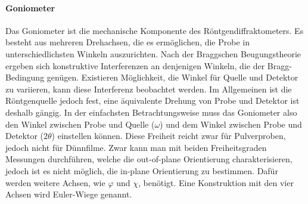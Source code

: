 \paragraph{Goniometer}
Das Goniometer ist die mechanische Komponente des Röntgendiffraktometers.
Es besteht aus mehreren Drehachsen, die es ermöglichen, die Probe in unterschiedlichsten Winkeln auszurichten.
Nach der Braggschen Beugungstheorie ergeben sich konstruktive Interferenzen an denjenigen Winkeln, die der
Bragg-Bedingung genügen.
Existieren Möglichkeit, die Winkel für Quelle und Detektor zu variieren, kann diese Interferenz beobachtet werden.
Im Allgemeinen ist die Röntgenquelle jedoch fest, eine äquivalente Drehung von Probe und Detektor ist deshalb gängig.
In der einfachsten Betrachtungsweise muss das Goniometer also den Winkel zwischen Probe und Quelle ($\omega$) und dem
Winkel zwischen Probe und Detektor ($2\theta$) einstellen können.
Diese Freiheit reicht zwar für Pulverproben, jedoch nicht für Dünnfilme.
Zwar kann man mit beiden Freiheitsgraden Messungen durchführen, welche die out-of-plane Orientierung charakterisieren,
jedoch ist es nicht möglich, die in-plane Orientierung zu bestimmen.
Dafür werden weitere Achsen, wie $\varphi$ und $\chi$, benötigt.
Eine Konstruktion mit den vier Achsen wird Euler-Wiege genannt.

